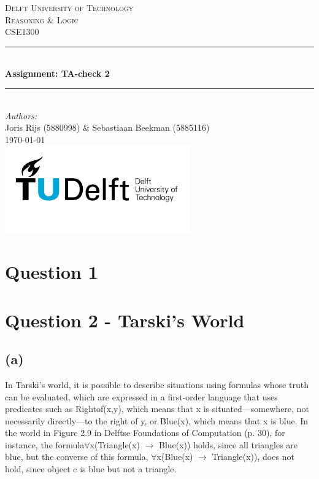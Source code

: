 \documentclass[a4paper]{article}
\begin{document}
\begin{titlepage}
    \newcommand{\HRule}{\rule{\linewidth}{0.5mm}}
    \center

    \textsc{\LARGE Delft University of Technology}\\[1cm]

    \textsc{\Large Reasoning \& Logic}\\[0.2cm]
    \textsc{\large CSE1300}\\[1cm]
    \HRule \\[0.8cm]
    { \huge \bfseries Assignment: TA-check 2}\\[0.7cm]
    \HRule \\[2cm]
    \large
    \emph{Authors:}\\
    Joris Rijs (5880998) \& Sebastiaan Beekman (5885116)\\[1.5cm]
    {\large \today}\\[5cm]
    \includegraphics[width=0.6\textwidth]{images/TU_delft_logo.jpg}\\[1cm]
    \vfill
\end{titlepage}

\newpage
\tableofcontents

\newpage
\section{Question 1}

\newpage
\section{Question 2 - Tarski's World}
\subsection{(a)}
In Tarski's world, it is possible to describe situations using formulas whose truth can be evaluated,
which are expressed in a first-order language that uses predicates such as Rightof(x,y),
which means that x is situated—somewhere, not necessarily directly—to the right of y, or Blue(x), which means that x is blue.
In the world in Figure 2.9 in Delftse Foundations of Computation (p. 30), for instance,
the formula$\forall $x(Triangle(x) $\rightarrow $ Blue(x)) holds, since all triangles are blue, but the converse of this
formula, $\forall $x(Blue(x) $\rightarrow $ Triangle(x)), does not hold, since object c is blue but not a triangle.
\end{document}
